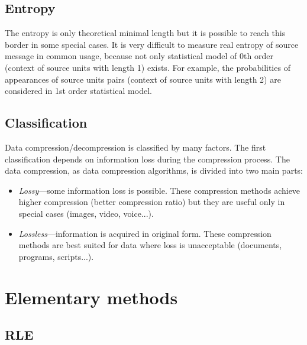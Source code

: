 \documentclass[thesis=M,english]{FITthesis}[2012/10/20]
\begin{document}
	\subsection{Entropy}
The entropy is only theoretical minimal length but it is possible to reach this border in some special cases. It is very difficult to measure real entropy of source message in common usage, because not only statistical model of 0th order (context of source units with length 1) exists. For example, the probabilities of appearances of source units pairs (context of source units with length 2) are considered in 1st order statistical model. 

	\subsection{Classification}

Data compression/decompression is classified by many factors. The first classification depends on information loss during the compression process. The data compression, as data compression algorithms, is divided into two main parts:
\begin{itemize}
	\item \textit{Lossy}---some information loss is possible. These compression methods achieve higher compression (better compression ratio) but they are useful only in special cases (images, video, voice...).
	\item \textit{Lossless}---information is acquired in original form. These compression methods are best suited for data where loss is unacceptable (documents, programs, scripts...).
\end{itemize}

\section{Elementary methods}


	\subsection{RLE}
\end{document}
